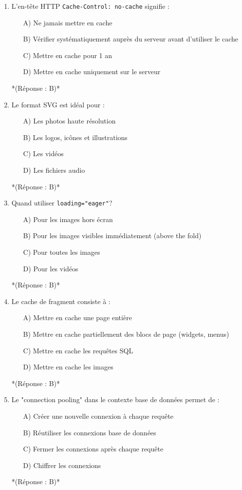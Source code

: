 \documentclass[12pt,a4paper,twoside]{report}
\begin{document}
\begin{enumerate}
\item L'en-tête HTTP \texttt{Cache-Control: no-cache} signifie :
\begin{itemize}
\item[A)] Ne jamais mettre en cache
\item[B)] Vérifier systématiquement auprès du serveur avant d'utiliser le cache
\item[C)] Mettre en cache pour 1 an
\item[D)] Mettre en cache uniquement sur le serveur
\end{itemize}
*(Réponse : B)*

\item Le format SVG est idéal pour :
\begin{itemize}
\item[A)] Les photos haute résolution
\item[B)] Les logos, icônes et illustrations
\item[C)] Les vidéos
\item[D)] Les fichiers audio
\end{itemize}
*(Réponse : B)*

\item Quand utiliser \texttt{loading="eager"}?
\begin{itemize}
\item[A)] Pour les images hors écran
\item[B)] Pour les images visibles immédiatement (above the fold)
\item[C)] Pour toutes les images
\item[D)] Pour les vidéos
\end{itemize}
*(Réponse : B)*

\item Le cache de fragment consiste à :
\begin{itemize}
\item[A)] Mettre en cache une page entière
\item[B)] Mettre en cache partiellement des blocs de page (widgets, menus)
\item[C)] Mettre en cache les requêtes SQL
\item[D)] Mettre en cache les images
\end{itemize}
*(Réponse : B)*

\item Le "connection pooling" dans le contexte base de données permet de :
\begin{itemize}
\item[A)] Créer une nouvelle connexion à chaque requête
\item[B)] Réutiliser les connexions base de données
\item[C)] Fermer les connexions après chaque requête
\item[D)] Chiffrer les connexions
\end{itemize}
*(Réponse : B)*


\end{enumerate}
\end{document}
